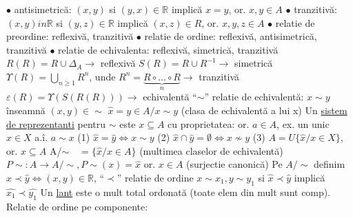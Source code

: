 \documentclass[8pt,twocolumn]{extarticle}
\begin{document}
	$\bullet$ antisimetrică: $(x, y)$ si $(y, x) \in \mathbb{R}$ implică $x = y$, or. $x, y \in A$ \newline
	$\bullet$ tranzitivă: $(x, y) in \mathbb{R}$ si $(y, z) \in \mathbb{R}$ implică $(x, z) \in R$, or. $x, y, z \in A$ \newline
	$\bullet$ relatie de preordine: reflexivă, tranzitivă \newline
	$\bullet$ relatie de ordine: reflexivă, antisimetrică, tranzitivă \newline
	$\bullet$ relatie de echivalenta: reflexivă, simetrică, tranzitivă \newline
	$R(R) = R \cup \Delta _{A} \rightarrow$ reflexivă \newline
	$S(R) = R \cup R^{-1} \rightarrow$ simetrică \newline
	$\Upsilon(R) = \bigcup_{n \geq 1} R^{n}$, unde $R^{n} = \underset{n}{\underbrace{R \circ ... \circ R}} \rightarrow$ tranzitivă \newline
	$\varepsilon(R) = \Upsilon(S(R(R))) \rightarrow$ echivalentă \newline
	``$\sim$'' relatie de echivalentă: $x \sim y$ înseamnă $(x, y) \in \sim$ \newline
	$\hat{x} = {y \in A / x \sim y}$ (clasa de echivalentă a lui x) \newline
	Un \underline{sistem de reprezentanti} pentru $\sim$ este $x \subseteq A$ cu proprietatea: \newline
	or. $a \in A$, ex. un unic $x \in X$ a.î. $a \sim x$ \newline
	(1) $\hat{x} = \hat{y} \Leftrightarrow x \sim y$ \newline
	(2) $\hat{x} \cap \hat{y} = \emptyset \Leftrightarrow x \not\sim y$ \newline
	(3) $A = U \{ \hat{x} / x \in X \}$, or. $x \subseteq A$ \newline
	A/$\sim \quad = \{ \hat{x} / x \in A \}$ (multimea claselor de echivalentă) \newline
	$P \sim : A \rightarrow A/\sim, P\sim(x) = \hat{x}$ or. $x \in A$ (surjectie canonică) \newline
	Pe $A/\sim$ definim $\hat{x} \prec \hat{y} \Leftrightarrow (x, y) \in \mathbb{R}$, ``$\prec$'' relatie de ordine $x \sim x_{1}, y \sim y_{1}$ si $\hat{x} \prec \hat{y}$ implică $\hat{x_{1}} \prec \hat{y_{1}}$ \newline
	Un \underline{lant} este o mult total ordonată (toate elem din mult sunt comp). \newline
	Relatie de ordine pe componente: \newline
\end{document}
